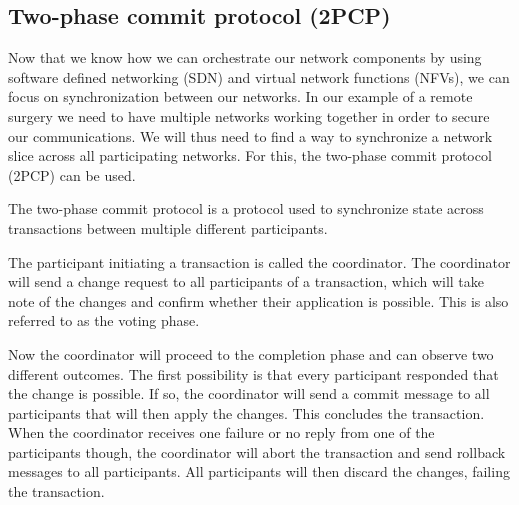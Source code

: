 
\subsection{Two-phase commit protocol (2PCP)}
Now that we know how we can orchestrate our network components by using software defined networking (SDN) and virtual network functions (NFVs), we can focus on synchronization between our networks. In our example of a remote surgery we need to have multiple networks working together in order to secure our communications. We will thus need to find a way to synchronize a network slice across all participating networks. For this, the two-phase commit protocol (2PCP) can be used.

The two-phase commit protocol \cite{2pcp} is a protocol used to synchronize state across transactions between multiple different participants.

The participant initiating a transaction is called the coordinator. The coordinator will send a change request to all participants of a transaction, which will take note of the changes and confirm whether their application is possible. This is also referred to as the voting phase.

Now the coordinator will proceed to the completion phase and can observe two different outcomes. The first possibility is that every participant responded that the change is possible. If so, the coordinator will send a commit message to all participants that will then apply the changes. This concludes the transaction. When the coordinator receives one failure or no reply from one of the participants though, the coordinator will abort the transaction and send rollback messages to all participants. All participants will then discard the changes, failing the transaction.


